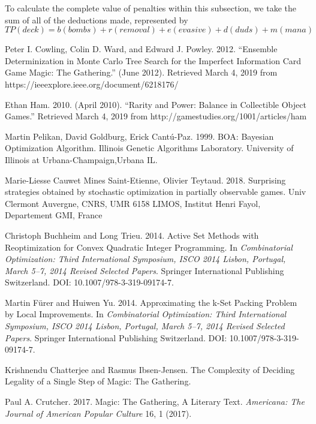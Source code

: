 \documentclass[12pt, letterpaper]{article}
\begin{document}
    To calculate the complete value of penalties within this subsection, we take the sum of all of the deductions made,
represented by $TP(deck) = b(bombs) + r(removal) + e(evasive) + d(duds) + m(mana)$

\begin{thebibliography}{9}


Peter I. Cowling, Colin D. Ward, and Edward J. Powley. 2012.
\enquote{Ensemble Determinization in Monte Carlo Tree Search for the Imperfect Information Card Game Magic: The
Gathering.}
(June 2012). Retrieved March 4, 2019 from https://ieeexplore.ieee.org/document/6218176/

Ethan Ham. 2010. (April 2010).
\enquote{Rarity and Power: Balance in Collectible Object Games.}
Retrieved March 4, 2019 from http://gamestudies.org/1001/articles/ham


Martin Pelikan, David Goldburg, Erick Cantú-Paz. 1999. BOA: Bayesian Optimization Algorithm. Illinois Genetic Algorithms
Laboratory. University of Illinois at Urbana-Champaign,Urbana IL.

Marie-Liesse Cauwet Mines Saint-Etienne, Olivier Teytaud. 2018. Surprising strategies obtained by stochastic
optimization in partially observable games. Univ Clermont Auvergne, CNRS, UMR 6158 LIMOS, Institut Henri Fayol,
Departement GMI, France


Christoph Buchheim and Long Trieu. 2014.
Active Set Methods with Reoptimization for Convex Quadratic Integer Programming.
In \textit{Combinatorial Optimization: Third International Symposium,
ISCO 2014 Lisbon, Portugal, March 5–7, 2014 Revised Selected Papers}.
Springer International Publishing Switzerland.
DOI: 10.1007/978-3-319-09174-7.

Martin Fürer and Huiwen Yu. 2014.
Approximating the k-Set Packing Problem by Local Improvements.
In \textit{Combinatorial Optimization: Third International Symposium,
ISCO 2014 Lisbon, Portugal, March 5–7, 2014 Revised Selected Papers}.
Springer International Publishing Switzerland.
DOI: 10.1007/978-3-319-09174-7.


Krishnendu Chatterjee and Rasmus Ibsen-Jensen.
The Complexity of Deciding Legality of a Single Step of Magic: The Gathering.

Paul A. Crutcher. 2017. Magic: The Gathering, A Literary Text.
\textit{Americana: The Journal of American Popular Culture} 16, 1 (2017).

\end{thebibliography}
\end{document}
